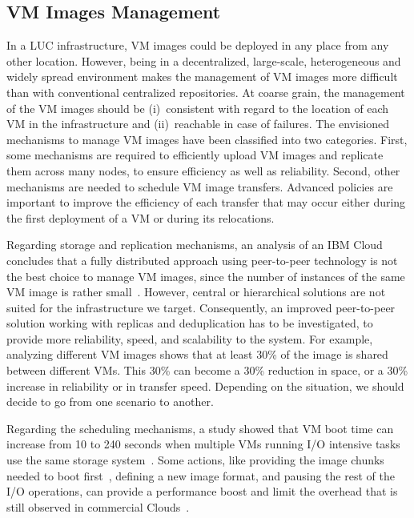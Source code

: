 \subsection{VM Images Management}

In a LUC infrastructure, VM images could be deployed in any place from any
other location. However, being in a decentralized, large-scale, heterogeneous and widely spread
environment makes the management of VM images more difficult than with
conventional centralized repositories.  
At coarse grain, the management of the VM images should be (i)~consistent
with regard to the location of each VM in the \discovery infrastructure and
(ii)~reachable in case of failures.
%
The envisioned mechanisms to manage VM images have been
classified into two categories.
%
First, some mechanisms are required to efficiently
upload VM images and replicate them across many nodes, to ensure
efficiency as well as reliability.  Second, other mechanisms 
are needed to schedule VM image
transfers. Advanced policies are important to improve the efficiency of each
transfer that may occur either during the first deployment of a VM or during its relocations. 

Regarding storage and replication mechanisms,  an analysis of an IBM Cloud concludes
that a fully distributed approach using peer-to-peer technology is not the best choice to manage VM images, since the
number of instances of the same VM image is rather small~\cite{peng:2012}. However, central or
hierarchical solutions are not suited for the infrastructure we target.
Consequently, an improved peer-to-peer solution working with replicas and
deduplication has to be investigated, to provide more
reliability, speed, and scalability to the system. For example, analyzing
different VM images shows that at least 30\% of the image is shared between
different VMs. This 30\% can become a 30\% reduction in space, or a
30\% increase in reliability or in transfer speed. Depending on the
situation, we should decide to go from one scenario to another. 

Regarding the scheduling mechanisms, a study showed that VM boot time can increase
from 10 to 240 seconds when multiple VMs running I/O intensive tasks use the
same storage system~\cite{tan:2008}. Some actions, like providing the
image chunks needed to boot first~\cite{tang:2011}, defining a new
image format, and pausing the rest of the I/O operations, can provide a
performance boost and limit the overhead that is still observed in commercial
Clouds~\cite{mao:2012}. 

